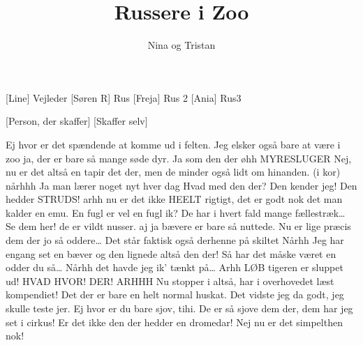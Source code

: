 \documentclass[a4paper,11pt]{article}
\title{Russere i Zoo}
\author{Nina og Tristan}
\begin{document}
\maketitle

\begin{roles}
[Line] Vejleder
    [Søren R] Rus
[Freja] Rus 2
[Ania] Rus3
\end{roles}

\begin{props}
    [Person, der skaffer]
    [Skaffer selv]
\end{props}


\begin{sketch}

 Ej hvor er det spændende at komme ud i felten.
 Jeg elsker også bare at være i zoo
 ja, der er bare så mange søde dyr.
 Ja som den der øhh MYRESLUGER
 Nej, nu er det altså en tapir det der, men de minder også lidt om hinanden.
 (i kor) nårhhh
 Ja man lærer noget nyt hver dag
 Hvad med den der?
 Den kender jeg! Den hedder STRUDS!
 arhh nu er det ikke HEELT rigtigt, det er godt nok det man kalder en emu. 
 En fugl er vel en fugl ik?
 De har i hvert fald mange fællestræk…
 Se dem her! de er vildt nusser.
 aj ja bævere er bare så nuttede.
   Nu er lige præcis dem der jo så oddere… Det står faktisk også derhenne på skiltet
 Nårhh
 Jeg har engang set en bæver og den lignede altså den der!
 Så har det måske været en odder du så…
 Nårhh det havde jeg ik’ tænkt på…
 Arhh LØB tigeren er sluppet ud!
 HVAD HVOR!
 DER! ARHHH
   Nu stopper i altså, har i overhovedet læst kompendiet! Det der er bare en helt normal huskat.
 Det vidste jeg da godt, jeg skulle teste jer.
 Ej hvor er du bare sjov, tihi.
 De er så sjove dem der, dem har jeg set i cirkus! 
 Er det ikke den der hedder en dromedar!
 Nej nu er det simpelthen nok!


\end{sketch}
\end{document}
